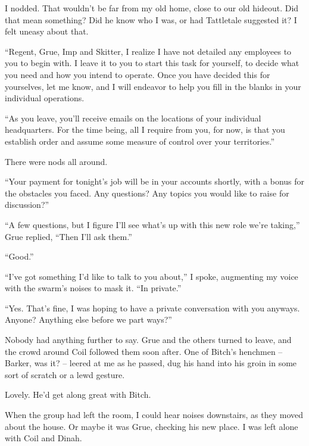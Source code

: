 I nodded.  That wouldn't be far from my old home, close to our old hideout.  Did that mean something?  Did he know who I was, or had Tattletale suggested it?  I felt uneasy about that.



``Regent, Grue, Imp and Skitter, I realize I have not detailed any employees to you to begin with.  I leave it to you to start this task for yourself, to decide what you need and how you intend to operate.  Once you have decided this for yourselves, let me know, and I will endeavor to help you fill in the blanks in your individual operations.



``As you leave, you'll receive emails on the locations of your individual headquarters.  For the time being, all I require from you, for now, is that you establish order and assume some measure of control over your territories.''



There were nods all around.



``Your payment for tonight's job will be in your accounts shortly, with a bonus for the obstacles you faced.  Any questions?  Any topics you would like to raise for discussion?''



``A few questions, but I figure I'll see what's up with this new role we're taking,'' Grue replied, ``Then I'll ask them.''



``Good.''



``I've got something I'd like to talk to you about,'' I spoke, augmenting my voice with the swarm's noises to mask it.  ``In private.''



``Yes.  That's fine, I was hoping to have a private conversation with you anyways.  Anyone?  Anything else before we part ways?''



Nobody had anything further to say.  Grue and the others turned to leave, and the crowd around Coil followed them soon after.  One of Bitch's henchmen – Barker, was it? – leered at me as he passed, dug his hand into his groin in some sort of scratch or a lewd gesture.



Lovely.  He'd get along great with Bitch.



When the group had left the room, I could hear noises downstairs, as they moved about the house.  Or maybe it was Grue, checking his new place.  I was left alone with Coil and Dinah.



